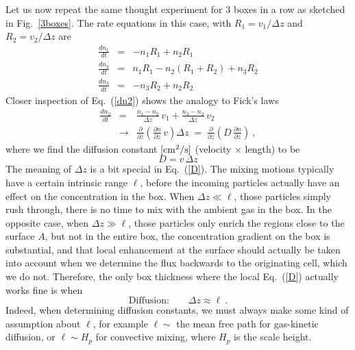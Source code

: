 \documentclass[11pt]{article}
\begin{document}
\noindent Let us now repeat the same thought experiment for 3 boxes in
a row as sketched in Fig.~\ref{3boxes}. The rate equations in this case, with
$R_1=v_1/\Delta z$ and $R_2=v_2/\Delta z$ are
\begin{eqnarray}
  \frac{dn_1}{dt} &=& -n_1 R_1 + n_2 R_1 \\
  \frac{dn_2}{dt} &=&  n_1 R_1 - n_2 (R_1+R_2) + n_3 R_2\label{dn2}\\ 
  \frac{dn_3}{dt} &=& -n_3 R_2 + n_2 R_2
\end{eqnarray}
Closer inspection of Eq.~(\ref{dn2}) shows the analogy to Fick's laws
\begin{eqnarray}
  \frac{dn_2}{dt} &=& \frac{n_1-n_2}{\Delta z}\,v_1 
                    + \frac{n_3-n_2}{\Delta z}\,v_2\\
  &\to& \frac{\partial}{\partial z}
      \left(\frac{\partial n}{\partial z}\,v\right)\Delta z
  \;=\; \frac{\partial}{\partial z}
      \left(D\,\frac{\partial n}{\partial z}\right) \ ,
\end{eqnarray}
where we find the diffusion constant $\rm[cm^2/s]$ (velocity $\times$
length) to be
\begin{equation}
  \boxed{D = v\,\Delta z}
  \label{D}
\end{equation}
The meaning of $\Delta z$ is a bit special in Eq.~(\ref{D}). The
mixing motions typically have a certain intrinsic range $\ell$, before the
incoming particles actually have an effect on the concentration in the
box.  When $\Delta z\ll\ell$, those particles simply rush through,
there is no time to mix with the ambient gas in the box. In the
opposite case, when $\Delta z\gg\ell$, those particles only enrich the
regions close to the surface $A$, but not in the entire box, the
concentration gradient on the box is substantial, and that
local enhancement at the surface should actually be taken into account when we
determine the flux backwards to the originating cell, which we do
not. Therefore, the only box thickness where the local Eq.~(\ref{D})
actually works fine is when
\begin{equation} 
  \mbox{Diffusion:}\quad\quad \Delta z \approx \ell \ .
\end{equation}
Indeed, when determining diffusion constants, we must always make some
kind of assumption about $\ell$, for example $\ell\sim$ the mean free
path for gas-kinetic diffusion, or $\ell\sim H_p$ for convective
mixing, where $H_p$ is the scale height.
\end{document}
